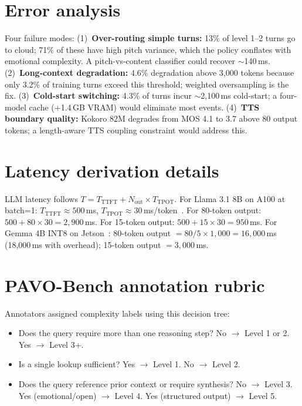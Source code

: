 \documentclass{article}
\begin{document}
\section{Error analysis}
\label{app:error}

Four failure modes: (1)~\textbf{Over-routing simple turns:} 13\% of level 1--2 turns go to cloud; 71\% of these have high pitch variance, which the policy conflates with emotional complexity. A pitch-vs-content classifier could recover $\sim$140\,ms. (2)~\textbf{Long-context degradation:} 4.6\% degradation above 3{,}000 tokens because only 3.2\% of training turns exceed this threshold; weighted oversampling is the fix. (3)~\textbf{Cold-start switching:} 4.3\% of turns incur $\sim$2{,}100\,ms cold-start; a four-model cache ($+$1.4\,GB VRAM) would eliminate most events. (4)~\textbf{TTS boundary quality:} Kokoro 82M degrades from MOS 4.1 to 3.7 above 80 output tokens; a length-aware TTS coupling constraint would address this.

\section{Latency derivation details}
\label{app:latency}

LLM latency follows $T = T_{\text{TTFT}} + N_{\text{out}}\times T_{\text{TPOT}}$. For Llama 3.1 8B on A100 at batch=1: $T_{\text{TTFT}}\approx500$\,ms, $T_{\text{TPOT}}\approx30$\,ms/token~\citep{mlperf2025}. For 80-token output: $500+80\times30=2{,}900$\,ms. For 15-token output: $500+15\times30=950$\,ms. For Gemma 4B INT8 on Jetson~\citep{song2023powerinfer}: 80-token output $=80/5\times1{,}000=16{,}000$\,ms (18{,}000\,ms with overhead); 15-token output $=3{,}000$\,ms.

\section{PAVO-Bench annotation rubric}
\label{app:rubric}

Annotators assigned complexity labels using this decision tree:
\begin{itemize}[leftmargin=*,itemsep=1pt]
  \item Does the query require more than one reasoning step? No $\to$ Level 1 or 2. Yes $\to$ Level 3+.
  \item Is a single lookup sufficient? Yes $\to$ Level 1. No $\to$ Level 2.
  \item Does the query reference prior context or require synthesis? No $\to$ Level 3. Yes (emotional/open) $\to$ Level 4. Yes (structured output) $\to$ Level 5.
\end{itemize}
\end{document}
